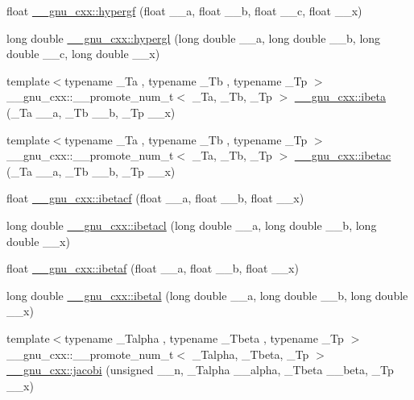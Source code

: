 \begin{DoxyCompactItemize}
\item 
float \hyperlink{group__gnu__math__spec__func_gac4c81e4ea9cef149fe40291ca10d7e15}{\+\_\+\+\_\+gnu\+\_\+cxx\+::hypergf} (float \+\_\+\+\_\+a, float \+\_\+\+\_\+b, float \+\_\+\+\_\+c, float \+\_\+\+\_\+x)
\item 
long double \hyperlink{group__gnu__math__spec__func_ga9961967087216e97f76283f29e1be152}{\+\_\+\+\_\+gnu\+\_\+cxx\+::hypergl} (long double \+\_\+\+\_\+a, long double \+\_\+\+\_\+b, long double \+\_\+\+\_\+c, long double \+\_\+\+\_\+x)
\item 
{\footnotesize template$<$typename \+\_\+\+Ta , typename \+\_\+\+Tb , typename \+\_\+\+Tp $>$ }\\\+\_\+\+\_\+gnu\+\_\+cxx\+::\+\_\+\+\_\+promote\+\_\+num\+\_\+t$<$ \+\_\+\+Ta, \+\_\+\+Tb, \+\_\+\+Tp $>$ \hyperlink{group__gnu__math__spec__func_ga99e687949634408cd1050cceedbdf962}{\+\_\+\+\_\+gnu\+\_\+cxx\+::ibeta} (\+\_\+\+Ta \+\_\+\+\_\+a, \+\_\+\+Tb \+\_\+\+\_\+b, \+\_\+\+Tp \+\_\+\+\_\+x)
\item 
{\footnotesize template$<$typename \+\_\+\+Ta , typename \+\_\+\+Tb , typename \+\_\+\+Tp $>$ }\\\+\_\+\+\_\+gnu\+\_\+cxx\+::\+\_\+\+\_\+promote\+\_\+num\+\_\+t$<$ \+\_\+\+Ta, \+\_\+\+Tb, \+\_\+\+Tp $>$ \hyperlink{group__gnu__math__spec__func_ga474e422dce07316da26bb2c2579b7968}{\+\_\+\+\_\+gnu\+\_\+cxx\+::ibetac} (\+\_\+\+Ta \+\_\+\+\_\+a, \+\_\+\+Tb \+\_\+\+\_\+b, \+\_\+\+Tp \+\_\+\+\_\+x)
\item 
float \hyperlink{group__gnu__math__spec__func_gabd7fa090deead18b167c26b8994b9f53}{\+\_\+\+\_\+gnu\+\_\+cxx\+::ibetacf} (float \+\_\+\+\_\+a, float \+\_\+\+\_\+b, float \+\_\+\+\_\+x)
\item 
long double \hyperlink{group__gnu__math__spec__func_ga48995d537b82e426362a4831ffa1be39}{\+\_\+\+\_\+gnu\+\_\+cxx\+::ibetacl} (long double \+\_\+\+\_\+a, long double \+\_\+\+\_\+b, long double \+\_\+\+\_\+x)
\item 
float \hyperlink{group__gnu__math__spec__func_ga97a5e3afdd990a2d3e199df6856bcf9f}{\+\_\+\+\_\+gnu\+\_\+cxx\+::ibetaf} (float \+\_\+\+\_\+a, float \+\_\+\+\_\+b, float \+\_\+\+\_\+x)
\item 
long double \hyperlink{group__gnu__math__spec__func_ga5c9c5b583e4f1c9785a1c4582551c97f}{\+\_\+\+\_\+gnu\+\_\+cxx\+::ibetal} (long double \+\_\+\+\_\+a, long double \+\_\+\+\_\+b, long double \+\_\+\+\_\+x)
\item 
{\footnotesize template$<$typename \+\_\+\+Talpha , typename \+\_\+\+Tbeta , typename \+\_\+\+Tp $>$ }\\\+\_\+\+\_\+gnu\+\_\+cxx\+::\+\_\+\+\_\+promote\+\_\+num\+\_\+t$<$ \+\_\+\+Talpha, \+\_\+\+Tbeta, \+\_\+\+Tp $>$ \hyperlink{group__gnu__math__spec__func_gac7be4bf3c7588f932ce754ee340d0338}{\+\_\+\+\_\+gnu\+\_\+cxx\+::jacobi} (unsigned \+\_\+\+\_\+n, \+\_\+\+Talpha \+\_\+\+\_\+alpha, \+\_\+\+Tbeta \+\_\+\+\_\+beta, \+\_\+\+Tp \+\_\+\+\_\+x)

\end{DoxyCompactItemize}
